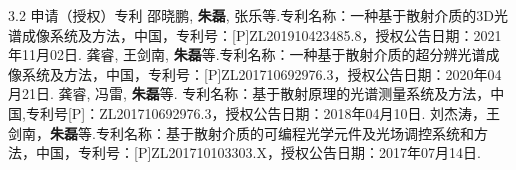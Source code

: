 \begin{resume}
\begin{resumelist}{\hspace{-0.25em}3.2\hspace{0.5em} 申请（授权）专利}
\resumelistitem 邵晓鹏, \textbf{朱磊}, 张乐等.专利名称：一种基于散射介质的3D光谱成像系统及方法，中国，专利号：[P]ZL201910423485.8，授权公告日期：2021年11月02日.
\resumelistitem 龚睿, 王剑南, \textbf{朱磊}等.专利名称：一种基于散射介质的超分辨光谱成像系统及方法，中国，专利号：[P]ZL201710692976.3，授权公告日期：2020年04月21日.
\resumelistitem 龚睿, 冯雷, \textbf{朱磊}等. 专利名称：基于散射原理的光谱测量系统及方法，中国,专利号[P]：ZL201710692976.3，授权公告日期：2018年04月10日.
\resumelistitem 刘杰涛，王剑南，\textbf{朱磊}等.专利名称：基于散射介质的可编程光学元件及光场调控系统和方法，中国，专利号：[P]ZL201710103303.X，授权公告日期：2017年07月14日.
\end{resumelist}

\end{resume}
